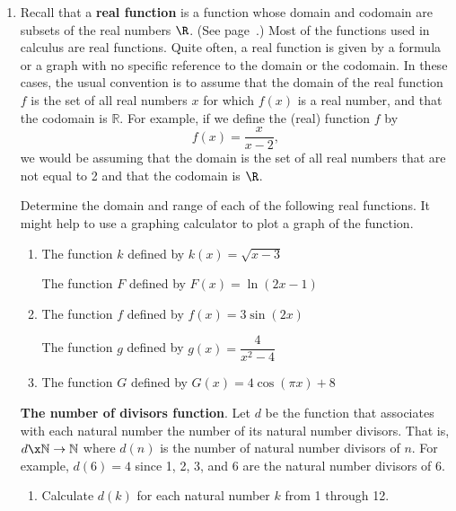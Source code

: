 \begin{enumerate}
\item Recall that a \textbf{real function}
%
%
 is a function whose domain and codomain are subsets of the real numbers  $\R$.  (See page~\pageref{realfunction}.)  Most of the functions used in calculus are real functions.  Quite often, a real function is given by a formula or a graph with no specific reference to the domain or the codomain.  In these cases, the usual convention is to assume that the domain of the real function  $f$  is the set of all real numbers  $x$  for which  $f( x )$  is a real number, and that the codomain is  
$\mathbb{R}$.  For example, if we define the (real) function  $f$  by  
\[
f( x ) = \frac{x}{{x - 2}},
\]
we would be assuming that the domain is the set of all real numbers that are not equal to  2 and that the codomain is $\R$.  

Determine the domain and range of each of the following real functions. \label{exer:sec61-9}  It might help to use a graphing calculator to plot a graph of the function.

\begin{enumerate}
  \item The function  $k$  defined by  $k( x ) = \sqrt {x - 3} $

  \yitem The function  $F$  defined by  $F( x ) = \ln \left( {2x - 1} \right)$

  \item The function  $f$  defined by  $f( x ) = 3\sin( {2x} )$

  \yitem The function  $g$ defined by  $g( x ) = \dfrac{4}{{x^2  - 4}}$

  \item The function $G$ defined by $G(x) = 4 \cos \left( \pi x \right) + 8$
\end{enumerate}


\xitem \textbf{The number of divisors function}.\label{exer:numberofdivisors}
%
  Let  $d$  be the function that associates with each natural number the number of its natural number divisors.  That is,  $d\x \mathbb{N} \to \mathbb{N}$  where  $d( n )$  
\label{sym:numdivisors} is the number of natural number divisors of  $n$.  For example,  
$d( 6 ) = 4$ since  1, 2, 3, and  6  are the natural number divisors of  6.

\begin{enumerate}
  \item Calculate  $d( k )$  for each natural number  $k$  from  1  through  12.


\end{enumerate}
\end{enumerate}
